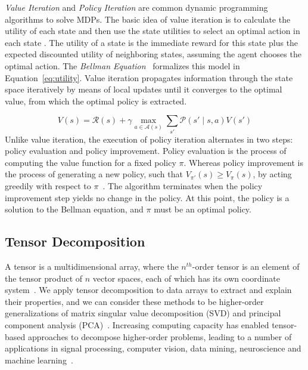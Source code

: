 \documentclass[letterpaper]{article} %
\begin{document}
\emph{Value Iteration} and \emph{Policy Iteration} are common dynamic programming algorithms to solve MDPs. The basic idea of value iteration is to calculate the utility of each state and then use the state utilities to select an optimal action in each state \cite{article-dynamic-programming-bellman}.
%
The utility of a state is the immediate reward for this state plus the expected discounted utility of neighboring states, assuming the agent chooses the optimal action. 
The \textit{Bellman Equation}~\cite{bellman_MDP_1957} formalizes this model in Equation~\ref{eq:utility}. Value iteration propagates information through the state space iteratively by means of local updates until it converges to the optimal value, from which the optimal policy is extracted. 

\begin{equation}\label{eq:utility}
    \displaystyle V(s) = \mathcal{R}(s) + \gamma  \max_{a \in \mathcal{A}(s)} \sum_{s'} \mathcal{P}(s' \mid s, a)V(s')
\end{equation}
Unlike value iteration, the execution of policy iteration alternates in two steps: policy evaluation and policy improvement. 
Policy evaluation is the process of computing the value function for a fixed policy $\pi$. 
Whereas policy improvement is the process of generating a new policy, such that $V_{\pi'}(s) \geq V_{\pi}(s)$, by acting greedily with respect to $\pi$~\cite[Ch. 4]{sutton_book_reinforcement_learning_2018}. 
The algorithm terminates when the policy improvement step yields no change in the policy.
At this point, the policy is a solution to the Bellman equation, and $\pi$ must be an optimal policy.


\subsection{Tensor Decomposition}

 
A tensor is a multidimensional array, where the $n^{th}$-order tensor is an element of the tensor product of $n$ vector spaces, each of which has its own coordinate system~\cite{kolda_tensor_decomposition_applications_2009}. 
We apply tensor decomposition to data arrays to extract and explain their properties, and we can consider these methods to be higher-order generalizations of matrix singular value decomposition (SVD) and principal component analysis (PCA)~\cite{kolda_tensor_decomposition_applications_2009}.
%
Increasing computing capacity has enabled tensor-based approaches to decompose higher-order problems, leading to a number of applications in signal processing, computer vision, data mining, neuroscience and machine learning~\cite{kolda_tensor_decomposition_applications_2009,sidiropoulos_tensor_decomposition_signal_ML_2017}.
\end{document}
